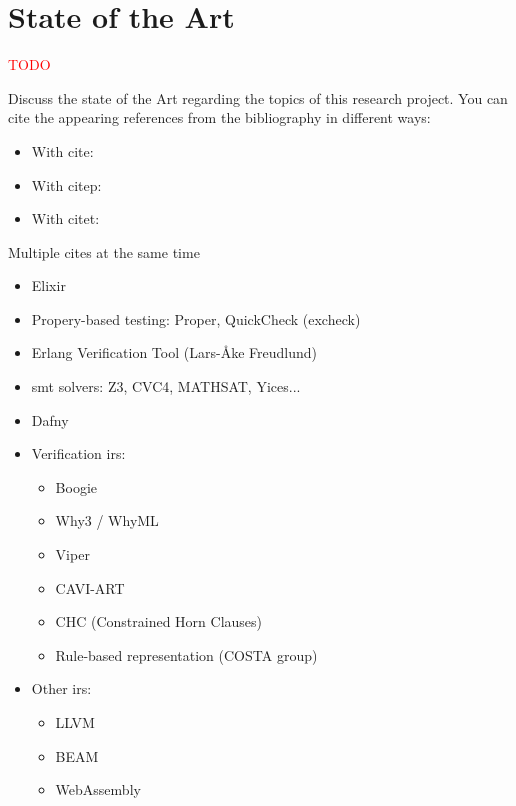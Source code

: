 \chapter{State of the Art}
\label{cap:stateOfTheArt}

\textcolor{red}{TODO}

Discuss the state of the Art regarding the topics of this research project. 
You can cite the appearing references from the bibliography in different ways:

\begin{itemize}
  \item With cite: \cite{notsoshort}
  \item With citep: \citep{notsoshort}
  \item With citet: \citet{notsoshort}
\end{itemize}

Multiple cites at the same time \citep{latexCompanion,LaTeXLamport,texKnuth}

\begin{itemize}
  \item Elixir
  \item Propery-based testing: Proper, QuickCheck (excheck)
  \item Erlang Verification Tool (Lars-Åke Freudlund)
  \item \acrshort{smt} solvers: Z3, CVC4, MATHSAT, Yices...
  \item Dafny
  \item Verification \gls{ir}s:
    \begin{itemize}
      \item Boogie
      \item Why3 / WhyML
      \item Viper
      \item CAVI-ART
      \item CHC (Constrained Horn Clauses)
      \item Rule-based representation (COSTA group)
    \end{itemize}
  \item Other \gls{ir}s:
    \begin{itemize}
      \item LLVM
      \item BEAM
      \item WebAssembly
    \end{itemize}
\end{itemize}
